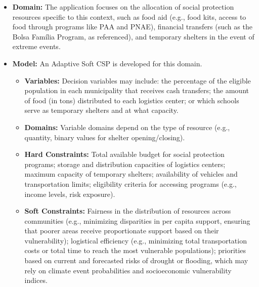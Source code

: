 \documentclass[letterpaper]{article}
\begin{document}
\begin{itemize}
    \item \textbf{Domain:} The application focuses on the allocation of social protection resources specific to this context, such as food aid (e.g., food kits, access to food through programs like PAA and PNAE), financial transfers (such as the Bolsa Família Program, as referenced), and temporary shelters in the event of extreme events.

    \item \textbf{Model:} An Adaptive Soft CSP is developed for this domain.
          \begin{itemize}
              \item \textbf{Variables:} Decision variables may include: the percentage of the eligible population in each municipality that receives cash transfers; the amount of food (in tons) distributed to each logistics center; or which schools serve as temporary shelters and at what capacity.
              \item \textbf{Domains:} Variable domains depend on the type of resource (e.g., quantity, binary values for shelter opening/closing).
              \item \textbf{Hard Constraints:} Total available budget for social protection programs; storage and distribution capacities of logistics centers; maximum capacity of temporary shelters; availability of vehicles and transportation limits; eligibility criteria for accessing programs (e.g., income levels, risk exposure).
              \item \textbf{Soft Constraints:} Fairness in the distribution of resources across communities (e.g., minimizing disparities in per capita support, ensuring that poorer areas receive proportionate support based on their vulnerability); logistical efficiency (e.g., minimizing total transportation costs or total time to reach the most vulnerable populations); priorities based on current and forecasted risks of drought or flooding, which may rely on climate event probabilities and socioeconomic vulnerability indices.
          \end{itemize}


\end{itemize}
\end{document}
